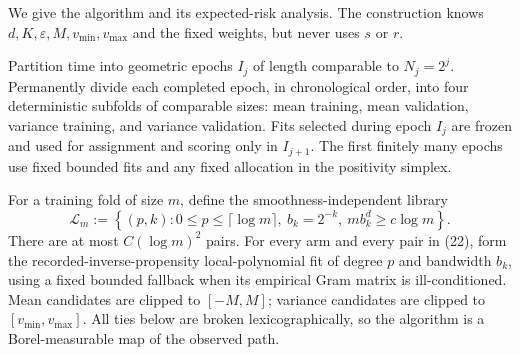 We give the algorithm and its expected-risk analysis.  The construction knows \(d,K,\varepsilon,M,v_{\min},v_{\max}\) and the fixed weights, but never uses \(s\) or \(r\).

Partition time into geometric epochs \(I_j\) of length comparable to \(N_j=2^j\).  Permanently divide each completed epoch, in chronological order, into four deterministic subfolds of comparable sizes: mean training, mean validation, variance training, and variance validation.  Fits selected during epoch \(I_j\) are frozen and used for assignment and scoring only in \(I_{j+1}\).  The first finitely many epochs use fixed bounded fits and any fixed allocation in the positivity simplex.

For a training fold of size \(m\), define the smoothness-independent library
\[
\mathcal L_m:=
\left\{(p,k):0\leq p\leq\lceil\log m\rceil,
\ b_k=2^{-k},\ mb_k^d\geq c\log m\right\}.
\tag{22}
\]
There are at most \(C(\log m)^2\) pairs.  For every arm and every pair in (22), form the recorded-inverse-propensity local-polynomial fit of degree \(p\) and bandwidth \(b_k\), using a fixed bounded fallback when its empirical Gram matrix is ill-conditioned.  Mean candidates are clipped to \([-M,M]\); variance candidates are clipped to \([v_{\min},v_{\max}]\).  All ties below are broken lexicographically, so the algorithm is a Borel-measurable map of the observed path.

